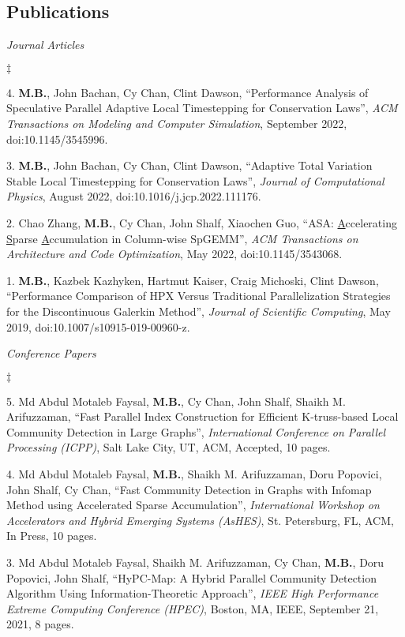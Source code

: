 \documentclass[margin,line]{res}
\newenvironment{list2}{
  \begin{list}{$\ddagger$}{%
      \setlength{\itemsep}{0in}
      \setlength{\parsep}{0in} \setlength{\parskip}{0in}
      \setlength{\topsep}{0in} \setlength{\partopsep}{0in}
      \setlength{\leftmargin}{0.2in}}}{\end{list}}
\newcommand{\article}[5]{%
#1, ``#2'', {\it #3}, #4, #5.%
}
\newcommand{\inproceeding}[7]{%
#1, ``#2'', {\it #3}, #4, #5, #6, #7 pages.%
}
\begin{document}
\begin{resume}
\section{\sc Publications}
\textit{Journal Articles}
\vspace{0.05in}
\begin{list2}
\item[4.] \article{{\bf M.B.}, John Bachan, Cy Chan, Clint Dawson}{Performance Analysis of Speculative Parallel Adaptive Local Timestepping for Conservation Laws}{ACM Transactions on Modeling and Computer Simulation}{September 2022}{doi:10.1145/3545996}
\item[3.] \article{{\bf M.B.}, John Bachan, Cy Chan, Clint Dawson}{Adaptive Total Variation Stable Local Timestepping for Conservation Laws}{Journal of Computational Physics}{August 2022}{\newline doi:10.1016/j.jcp.2022.111176}
\item[2.] \article{Chao Zhang, {\bf M.B.}, Cy Chan, John Shalf, Xiaochen Guo}{ASA: \underline{A}ccelerating \underline{S}parse \underline{A}ccumulation in Column-wise {SpGEMM}}{ACM Transactions on Architecture and Code Optimization}{May 2022}{doi:10.1145/3543068}
\item[1.] \article{{\bf M.B.}, Kazbek Kazhyken, Hartmut Kaiser, Craig Michoski, Clint Dawson}{Performance Comparison of HPX Versus Traditional Parallelization Strategies for the Discontinuous Galerkin Method}{Journal of Scientific Computing}{May 2019}{doi:10.1007/s10915-019-00960-z}
\end{list2}
\textit{Conference Papers}
\vspace{0.05in}
\begin{list2}
\item[5.] \inproceeding{Md Abdul Motaleb Faysal, {\bf M.B.},  Cy Chan, John Shalf, Shaikh M. Arifuzzaman}{Fast Parallel Index Construction for Efficient K-truss-based Local Community Detection in Large Graphs}{International Conference on Parallel Processing (ICPP)}{Salt Lake City, UT}{ACM}{Accepted}{10}
\item[4.] \inproceeding{Md Abdul Motaleb Faysal, {\bf M.B.}, Shaikh M. Arifuzzaman, Doru Popovici, John Shalf, Cy Chan}{Fast Community Detection in Graphs with {Infomap} Method using Accelerated Sparse Accumulation}{International Workshop on Accelerators and Hybrid Emerging Systems (AsHES)}{St. Petersburg, FL}{ACM}{In Press}{10}
\item[3.] \inproceeding{Md Abdul Motaleb Faysal, Shaikh M. Arifuzzaman, Cy Chan, {\bf M.B.}, Doru Popovici, John Shalf}{{HyPC-Map}: {A} Hybrid Parallel Community Detection Algorithm Using Information-Theoretic Approach}{IEEE High Performance Extreme Computing Conference (HPEC)}{Boston, MA}{IEEE}{September 21, 2021}{8}

\end{list2}
\end{resume}
\end{document}
